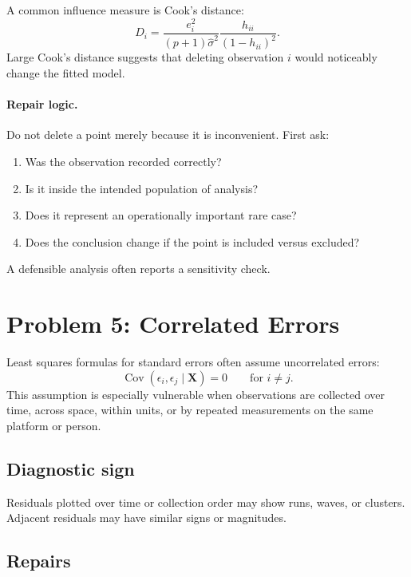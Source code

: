 A common influence measure is Cook's distance:
\begin{equation}
  D_i
  =\frac{e_i^2}{(p+1)\widehat{\sigma}^2}
  \frac{h_{ii}}{(1-h_{ii})^2}.
\end{equation}
Large Cook's distance suggests that deleting observation \(i\) would noticeably change the fitted model.

\paragraph{Repair logic.}
Do not delete a point merely because it is inconvenient.  First ask:
\begin{enumerate}
  \item Was the observation recorded correctly?
  \item Is it inside the intended population of analysis?
  \item Does it represent an operationally important rare case?
  \item Does the conclusion change if the point is included versus excluded?
\end{enumerate}
A defensible analysis often reports a sensitivity check.

\section{Problem 5: Correlated Errors}

Least squares formulas for standard errors often assume uncorrelated errors:
\begin{equation}
  \operatorname{Cov}(\epsilon_i,\epsilon_j\mid\mathbf{X})=0
  \qquad\text{for }i\ne j.
\end{equation}
This assumption is especially vulnerable when observations are collected over time, across space, within units, or by repeated measurements on the same platform or person.

\subsection*{Diagnostic sign}

Residuals plotted over time or collection order may show runs, waves, or clusters.  Adjacent residuals may have similar signs or magnitudes.

\subsection*{Repairs}

